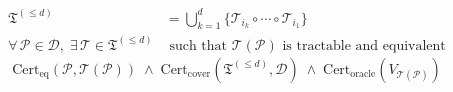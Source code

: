 \begin{align}
\mathfrak{T}^{(\le d)} &= \bigcup_{k=1}^{d}\bigl\{\mathcal{T}_{i_k}\circ\cdots\circ\mathcal{T}_{i_1}\bigr\} \\[6pt]
\forall\,\mathcal{P}\in\mathcal{D},\;\exists\,\mathcal{T}\in\mathfrak{T}^{(\le d)}&\text{ such that }\mathcal{T}(\mathcal{P})\text{ is tractable and equivalent}
\end{align}
\begin{equation}
\mathrm{Cert}_{\mathrm{eq}}(\mathcal{P},\mathcal{T}(\mathcal{P})) \;\wedge\; \mathrm{Cert}_{\mathrm{cover}}(\mathfrak{T}^{(\le d)},\mathcal{D}) \;\wedge\; \mathrm{Cert}_{\mathrm{oracle}}(V_{\mathcal{T}(\mathcal{P})})
\end{equation}
